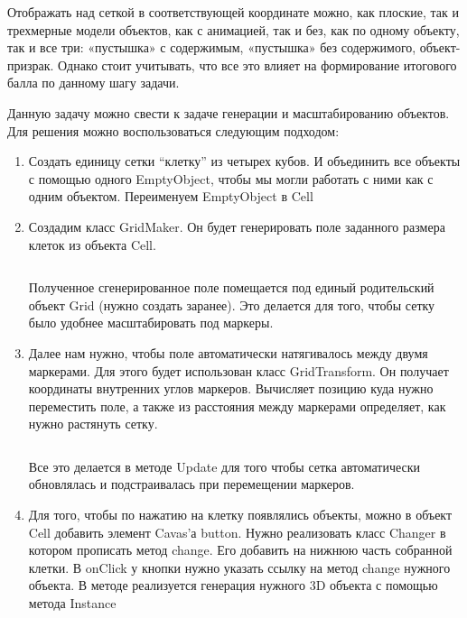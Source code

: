 Отображать над сеткой в соответствующей координате можно, как плоские, так и трехмерные модели объектов, как с анимацией, так и без, как по одному объекту, так и все три: «пустышка» с содержимым, «пустышка» без содержимого, объект-призрак. Однако стоит учитывать, что все это влияет на формирование итогового балла по данному шагу задачи.

\solutionSection

Данную задачу можно свести к задаче генерации и масштабированию объектов. Для решения можно воспользоваться следующим подходом:

\begin{enumerate}
    \item Создать единицу сетки “клетку” из четырех кубов. И объединить все объекты с помощью одного EmptyObject, чтобы мы могли работать с ними как с одним объектом. Переименуем EmptyObject в Cell
    \item Создадим класс GridMaker. Он будет генерировать поле заданного размера клеток из объекта Cell.
    \inputminted[fontsize=\footnotesize, linenos]{csharp}{2nd_tour/ar/task_69/source_1.cs}

    Полученное сгенерированное поле помещается под единый родительский объект Grid (нужно создать заранее). Это делается для того, чтобы сетку было удобнее масштабировать под маркеры. 
    \item Далее нам нужно, чтобы поле автоматически натягивалось между двумя маркерами. Для этого будет использован класс GridTransform. Он получает координаты внутренних углов маркеров. Вычисляет позицию куда нужно переместить поле, а также из расстояния между маркерами определяет, как нужно растянуть сетку.  
    
    \inputminted[fontsize=\footnotesize, linenos]{csharp}{2nd_tour/ar/task_69/source_2.cs}
    Все это делается в методе Update для того чтобы сетка автоматически обновлялась и подстраивалась при перемещении маркеров.
    
    \item Для того, чтобы по нажатию на клетку появлялись объекты, можно в объект Cell  добавить элемент Cavas'а button. Нужно реализовать класс Changer в котором прописать метод change. Его добавить на нижнюю часть собранной клетки. В onClick у кнопки нужно указать ссылку на метод change нужного объекта.  В методе реализуется генерация нужного 3D объекта с помощью метода Instance
\end{enumerate}